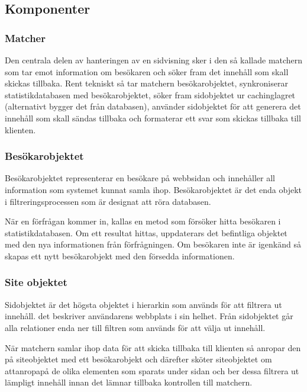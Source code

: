 \subsection{Komponenter}


\subsubsection{Matcher}

Den centrala delen av hanteringen av en sidvisning sker i den så kallade matchern som tar emot information om besökaren och söker fram det innehåll som skall skickas tillbaka. Rent tekniskt så tar matchern besökarobjektet, synkroniserar statistikdatabasen med besökarobjektet, söker fram sidobjektet ur cachinglagret (alternativt bygger det från databasen), använder sidobjektet för att generera det innehåll som skall sändas tillbaka och formaterar ett svar som skickas tillbaka till klienten.

\subsubsection{Besökarobjektet}

Besökarobjektet representerar en besökare på webbsidan och innehåller all information som systemet kunnat samla ihop. Besökarobjektet är det enda objekt i filtreringsprocessen som är designat att röra databasen.

När en förfrågan kommer in, kallas en metod som försöker hitta besökaren i statistikdatabasen. Om ett resultat hittas, uppdaterars det befintliga objektet med den nya informationen från förfrågningen. Om besökaren inte är igenkänd så skapas ett nytt besökarobjekt med den försedda informationen.

\subsubsection{Site objektet}



Sidobjektet är det högsta objektet i hierarkin som används för att filtrera ut innehåll. det beskriver användarens webbplats i sin helhet. Från sidobjektet går alla relationer enda ner till filtren som används för att välja ut innehåll.

När matchern samlar ihop data för att skicka tillbaka till klienten så anropar den på siteobjektet med ett besökarobjekt och därefter sköter siteobjektet om attanropapå de olika elementen som sparats under sidan och ber dessa filtrera ut lämpligt innehåll innan det lämnar tillbaka kontrollen till matchern.

